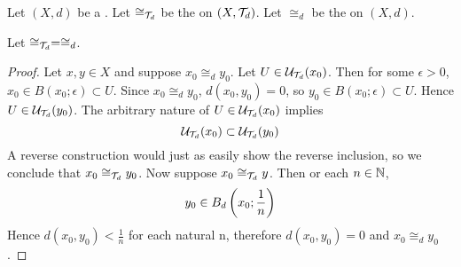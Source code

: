\label{prop:relationofzerodistance}
\begin{prop}
    Let $(X,d)$ be a \PseudometricSpace.
    Let $\cong_{\mathcal{T}_d}$ be the \RelationOfEqualNeighborhoodFilters on $(X,\mathcal{T}_d)$. 
    Let $\cong_d$ be the \RelationOfZeroDistance on $(X,d)$. 
    
    
    Let $\cong_{\mathcal{T}_d} = \cong_d$. 
    \begin{proof}
        Let $x,y \in X$ and suppose $x_0 \cong_d y_0$.
        Let $U \in \mathcal{U}_{\mathcal{T}_d}(x_0)$. Then for some $\epsilon > 0$, 
        $x_0 \in B(x_0;\epsilon) \subset U$. 
        Since $x_0 \cong_d y_0$, $d(x_0,y_0) = 0$, so $y_0 \in B(x_0 ; \epsilon) \subset U$. 
        Hence $U \in \mathcal{U}_{\mathcal{T}_d}(y_0)$. 
        The arbitrary nature of $U \in \mathcal{U}_{\mathcal{T}_d}(x_0)$ implies 
        \begin{equation}
            \mathcal{U}_{\mathcal{T}_d}(x_0) \subset \mathcal{U}_{\mathcal{T}_d}(y_0)
        \end{equation}
        A reverse construction would just as easily show the reverse inclusion, so we conclude that $x_0 \cong_{\mathcal{T}_d} y_0$. 
        Now suppose $x_0 \cong_{\mathcal{T}_d} y $. Then or each $n \in \mathbb{N}$, 
        \begin{equation}
            y_0 \in B_{d} \left( x_0 ; \frac{1}{n}\right)
        \end{equation}
        Hence $d(x_0, y_0) < \frac{1}{n}$ for each natural n, therefore $d(x_0,y_0) = 0$ and $x_0 \cong_d y_0$. 
    \end{proof}
\end{prop}